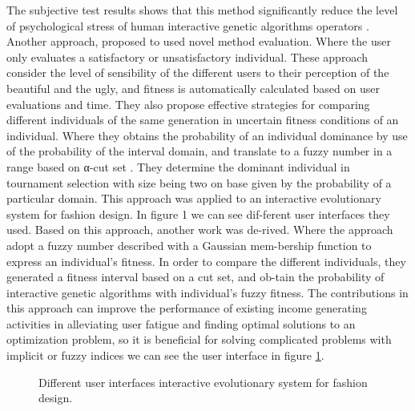 The subjective test results shows that this method significantly reduce the
level of psychological stress of human interactive genetic algorithms operators
\cite{ohsaki1998input}. Another approach, proposed to used novel method
evaluation. Where the user only evaluates a satisfactory or unsatisfactory
individual. These approach consider the level of sensibility of the different
users to their perception of the beautiful and the ugly, and fitness is
automatically calculated based on user evaluations and time. They also propose
effective strategies for comparing different individuals of the same generation
in uncertain fitness conditions of an individual. Where they obtains the
probability of an individual dominance by use of the probability of the interval
domain, and translate to a fuzzy number in a range based on α-cut set
\cite{gong2009impact}. They determine the dominant individual in tournament
selection with size being two on base given by the probability of a particular
domain. This approach was applied to an interactive evolutionary system for
fashion design. In figure 1 we can see dif-ferent user interfaces they used.
Based on this approach, another work was de-rived. Where the approach adopt a
fuzzy number described with a Gaussian mem-bership function to express an
individual's fitness. In order to compare the different individuals, they
generated a fitness interval based on a cut set, and ob-tain the probability of
interactive genetic algorithms with individual's fuzzy fitness. The
contributions in this approach can improve the performance of existing income
generating activities in alleviating user fatigue and finding optimal solutions
to an optimization problem, so it is beneficial for solving complicated problems
with implicit or fuzzy indices \cite{gong2011interactive} we can see the user
interface in figure \ref{fig:fashion}.

\begin{figure}
\captionsetup{justification=centering,margin=2cm}
\centering
\setlength\fboxsep{0pt}
\setlength\fboxrule{0.7pt}
\caption{Different user interfaces interactive evolutionary system for fashion design.}
\label{fig:fashion}       
\end{figure}

